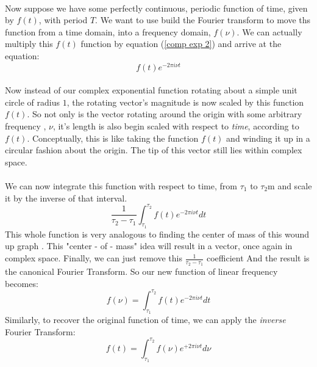 \documentclass[12pt,letterpaper]{article}
\begin{document}
\paragraph*{}Now suppose we have some perfectly continuous, periodic function of time, given by $f(t)$, with period $T$. We want to use build the Fourier transform to move ths function from a time domain, into a frequency domain, $f(\nu)$. We can actually multiply this $f(t)$ function by equation (\ref{comp exp 2}) and arrive at the equation:
\begin{equation}
f(t) e^{-2\pi i\nu t}
\end{equation}
\paragraph*{}Now instead of our complex exponential function rotating about a simple unit circle of radius $1$, the rotating vector's magnitude is now scaled by this function $f(t)$. So not only is the vector rotating around the origin with some arbitrary frequency , $\nu$, it's length is also begin scaled with respect to \textit{time}, according to $f(t)$. Conceptually, this is like taking the function $f(t)$ and winding it up in a circular fashion about the origin. The tip of this vector still lies within complex space.
\paragraph*{}We can now integrate this function with respect to time, from 
$\tau_1$ to $\tau_2$m and scale it by the inverse of that interval.
\begin{equation}
\frac{1}{\tau_2 - \tau_1}\int_{\tau_1}^{\tau_2} f(t) e^{-2\pi i\nu t} dt
\end{equation}
This whole function is very analogous to finding the center of mass of this wound up graph \cite{Sanderson}. This "center - of - mass" idea will result in a vector, once again in complex space. Finally, we can just remove this $\frac{1}{\tau_2 - \tau_1}$ coefficient And the result is the canonical Fourier Transform. So our new function of linear frequency becomes:
\begin{equation}
\label{Fourier Transform}
f(\nu) = \int_{\tau_1}^{\tau_2} f(t) e^{-2\pi i\nu t} dt
\end{equation}
Similarly, to recover the original function of time, we can apply the \textit{inverse} Fourier Transform:
\begin{equation}
\label{Inv Fourier Transform}
f(t) = \int_{\tau_1}^{\tau_2} f(\nu) e^{+2\pi i\nu t} d\nu
\end{equation}
\end{document}
